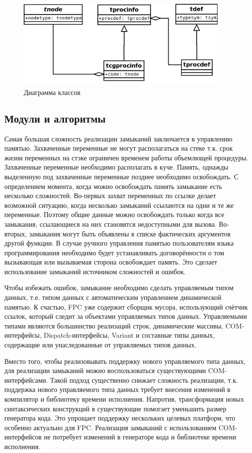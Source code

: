 \documentclass{imcs}
\begin{document}
\begin{figure}[htb]
\centering
\includegraphics[width=400px]{./uml/tprocinfo.png}
\caption{Диаграмма классов}
\label{tprocinfo}
\end{figure}

\subsection{Модули и алгоритмы}

Самая большая сложность реализации замыканий заключается в управлению памятью. Захваченные переменные
не могут располагаться на стеке т.к. срок жизни переменных на стэке ограничен временем
работы объемлющей процедуры. Захваченные переменные необходимо располагать в куче. Память, однажды
выделенную под захваченные переменные позднее необходимо освобождать. С определением момента,
когда можно освобождать память замыкание есть несколько сложностей. Во-первых 
захват переменных по ссылке делает возможной ситуацию, когда несколько замыканий ссылаются 
на одни и те же переменные. Поэтому общие данные можно освобождать только когда все замыкания,
ссылающиеся на них становятся недоступными для вызова. Во-вторых, замыкания
могут быть объявлены в списке фактических аргументов другой функции. В случае ручного управления 
памятью пользователям языка программирования необходимо будет устанавливать договорённости
о том вызывающая или вызываемая сторона освобождает память. Это сделает использование замыканий
источником сложностей и ошибок.

Чтобы избежать ошибок, замыкание необходимо сделать управляемым типом данных, т.е.
типом данных с автоматическим управлением динамической памятью. К счастью, FPC уже содержит
сборщик мусора, использующий счётчик ссылок, который следит за объектами управляемых
типов данных. Управляемыми типами являются 
большинство реализаций строк, динамические массивы, COM-интерфейсы, Dispatch-интерфейсы, Variant и
составные типы данных, содержащие или унаследованные от управляемых типов данных.

Вместо того, чтобы реализовывать поддержку нового управляемого типа данных, для реализации
замыканий можно воспользоваться существующими COM-интерфейсами. Такой подход существенно
снижает сложность реализации, т.к. поддержка нового управляемого типа данных требует внесения
изменений в компилятор и библиотеку времени исполнения. Напротив, трансформация новых синтаксических
конструкций в существующие помогает уменьшить размер генератора кода. Это упрощает
поддержку нескольких целевых платформ, что особенно актуально для FPC. Реализация замыканий 
с использованием COM-интерфейсов не потребует изменений в генераторе кода и библиотеке
времени исполнения.
\end{document}
